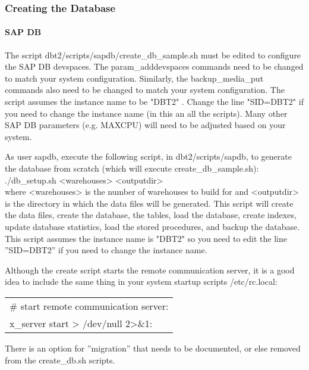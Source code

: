 \documentclass{article}
\begin{document}
\subsubsection{Creating the Database}

\paragraph{SAP DB}

The script dbt2/scripts/sapdb/create\_db\_sample.sh must be edited to
configure the SAP DB devspaces.  The param\_adddevspaces commands need to be
changed to match your system configuration.  Similarly, the backup\_media\_put
commands also need to be changed to match your system configuration.  The
script assumes the instance name to be "DBT2" .  Change the line "SID=DBT2"
if you need to change the instance name (in this an all the scripts).  Many
other SAP DB parameters (e.g. MAXCPU) will need to be adjusted based on your
system.

As user sapdb, execute the following script, in dbt2/scripts/sapdb, to
generate the database from scratch (which will execute create\_db\_sample.sh): \\
./db\_setup.sh <warehouses> <outputdir> \\
where <warehouses> is the number of warehouses to build for and <outputdir>
is the directory in which the data files will be generated.  This script will
create the data files, create the database, the tables, load the database,
create indexes, update database statistics, load the stored procedures, and
backup the database.  This script assumes the instance name is "DBT2" so you
need to edit the line ''SID=DBT2'' if you need to change the instance name.

Although the create script starts the remote communication server, it is a
good idea to include the same thing in your system startup scripts
/etc/rc.local: \\
\begin{tabular}[c]{l}
\# start remote communication server: \\
x\_server start > /dev/null 2>\&1: \\
\end{tabular}

There is an option for ''migration'' that needs to be documented, or else
removed from the create\_db.sh scripts.
\end{document}
